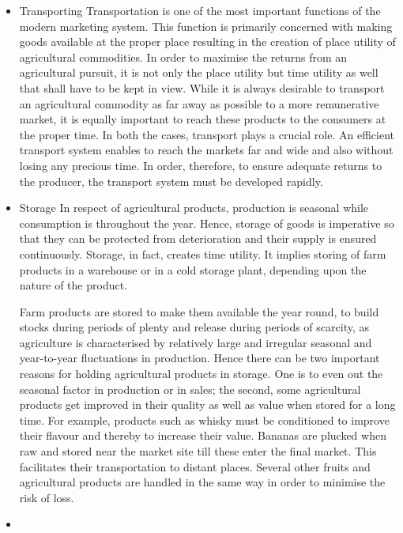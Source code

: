 \documentclass[11pt,]{book}
\theoremstyle{definition}
\theoremstyle{definition}
\theoremstyle{definition}
\theoremstyle{remark}
\begin{document}
\begin{itemize}
\item
  Transporting \newline Transportation is one of the most important
  functions of the modern marketing system. This function is primarily
  concerned with making goods available at the proper place resulting in
  the creation of place utility of agricultural commodities. In order to
  maximise the returns from an agricultural pursuit, it is not only the
  place utility but time utility as well that shall have to be kept in
  view. While it is always desirable to transport an agricultural
  commodity as far away as possible to a more remunerative market, it is
  equally important to reach these products to the consumers at the
  proper time. In both the cases, transport plays a crucial role. An
  efficient transport system enables to reach the markets far and wide
  and also without losing any precious time. In order, therefore, to
  ensure adequate returns to the producer, the transport system must be
  developed rapidly.
\item
  Storage \newline In respect of agricultural products, production is
  seasonal while consumption is throughout the year. Hence, storage of
  goods is imperative so that they can be protected from deterioration
  and their supply is ensured continuously. Storage, in fact, creates
  time utility. It implies storing of farm products in a warehouse or in
  a cold storage plant, depending upon the nature of the product. \par
  Farm products are stored to make them available the year round, to
  build stocks during periods of plenty and release during periods of
  scarcity, as agriculture is characterised by relatively large and
  irregular seasonal and year-to-year fluctuations in production. Hence
  there can be two important reasons for holding agricultural products
  in storage. One is to even out the seasonal factor in production or in
  sales; the second, some agricultural products get improved in their
  quality as well as value when stored for a long time. For example,
  products such as whisky must be conditioned to improve their flavour
  and thereby to increase their value. Bananas are plucked when raw and
  stored near the market site till these enter the final market. This
  facilitates their transportation to distant places. Several other
  fruits and agricultural products are handled in the same way in order
  to minimise the risk of loss.
\item

\end{itemize}
\end{document}
